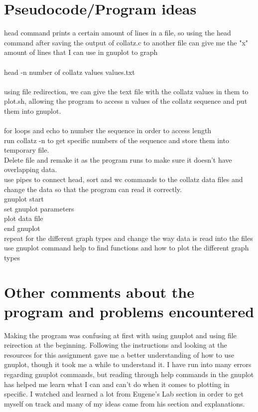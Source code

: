 \documentclass[11pt]{article}
\begin{document}
\section{Pseudocode/Program ideas}\label{ss:pseudo}
head command prints a certain amount of lines in a file, so using the head command after saving the output of collatz.c to another file can give me the "x" amount of lines that I can use in gnuplot to graph\\ \\head -n number of collatz values values.txt\\ \\using file redirection, we can give the text file with the collatz values in them to plot.sh, allowing the program to access n values of the collatz sequence and put them into gnuplot.\\ \\for loops and echo to number the sequence in order to access length\\run collatz -n to get specific numbers of the sequence and store them into temporary file.\\ Delete file and remake it as the program runs to make sure it doesn't have overlapping data.\\use pipes to connect head, sort and wc commands to the collatz data files and change the data so that the program can read it correctly.\\gnuplot start\\set gnuplot parameters\\plot data file\\end gnuplot\\repeat for the different graph types and change the way data is read into the files\\use gnuplot command help to find functions and how to plot the different graph types
\section{Other comments about the program and problems encountered}\label{cc:comments}
Making the program was confusing at first with using gnuplot and using file reirection at the beginning. Following the instructions and looking at the resources for this assignment gave me a better understanding of how to use gnuplot, though it took me a while to understand it. I have run into many errors regarding gnuplot commands, but reading through help commands in the gnuplot has helped me learn what I can and can't do when it comes to plotting in specific. I watched and learned a lot from  Eugene's Lab section in order to get myself on track and many of my ideas came from his section and explanations. 
\end{document}
